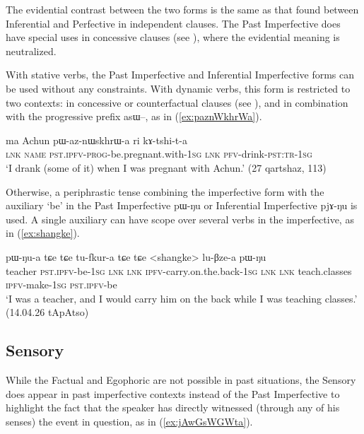 \documentclass[oldfontcommands,oneside,a4paper,11pt]{article}
\newcommand{\ipa}[1]{{\phon \mbox{#1}}} %
\newcommand{\refb}[1]{(\ref{#1})}
\begin{document}
The evidential contrast between the two forms is the same as that found between Inferential and Perfective in independent clauses. The Past Imperfective does have special uses in concessive clauses (see \citealt[298]{jacques14linking}), where the evidential meaning is neutralized.

With stative verbs, the Past Imperfective and Inferential Imperfective forms can be used without any constraints. With dynamic verbs, this form is restricted to two contexts: in concessive or counterfactual clauses (see \citealt[298]{jacques14linking}), and in combination with the progressive prefix \ipa{asɯ--}, as in \refb{ex:paznWkhrWa}.

\begin{exe}
\ex \label{ex:paznWkhrWa}
\gll 
\ipa{ma} 	Achun 	\ipa{pɯ-az-nɯskhrɯ-a} 	\ipa{ri} 	\ipa{kɤ-tshi-t-a} \\
\textsc{lnk} \textsc{name} \textsc{pst.ipfv-prog}-be.pregnant.with-\textsc{1sg} \textsc{lnk} \textsc{pfv}-drink-\textsc{pst:tr-1sg} \\
\glt `I drank (some of it) when I was pregnant with Achun.' (27 qartshaz, 113)
\end{exe}

Otherwise, a periphrastic tense combining the imperfective form with the auxiliary `be' in the Past Imperfective \ipa{pɯ-ŋu} or Inferential Imperfective \ipa{pjɤ-ŋu}  is used.   A single auxiliary  can have scope over several verbs in the imperfective, as in \refb{ex:shangke}.

\begin{exe}
\ex \label{ex:shangke}
\gll  \ipa{sloχpɯn} 	\ipa{pɯ-ŋu-a} 	\ipa{tɕe} 	\ipa{tɕe} 	\ipa{tu-fkur-a} 	\ipa{tɕe} 	\ipa{tɕe} 	 <shangke> 	\ipa{lu-βze-a} 	\ipa{pɯ-ŋu} \\
teacher \textsc{pst.ipfv}-be-\textsc{1sg} \textsc{lnk}  \textsc{lnk} \textsc{ipfv}-carry.on.the.back-\textsc{1sg} \textsc{lnk}  \textsc{lnk}  teach.classes \textsc{ipfv}-make-\textsc{1sg} \textsc{pst.ipfv}-be \\
\glt `I was a teacher, and I would carry him on the back while I was teaching classes.' (14.04.26 tApAtso)
\end{exe}


\subsection{Sensory}  \label{sec:pst:sens}
While the Factual and Egophoric are not possible in past situations, the Sensory does appear in past imperfective contexts instead of the Past Imperfective to highlight the fact that the speaker  has directly witnessed (through any of his senses) the event in question, as in \refb{ex:jAwGsWGWta}. 
\end{document}
